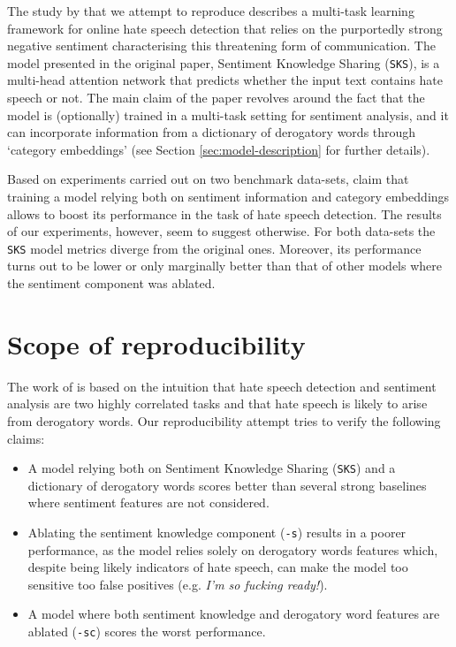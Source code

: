 The study by \cite{original_zhou} that we attempt to reproduce describes a multi-task learning framework for online hate speech detection that relies on the purportedly strong negative sentiment characterising this threatening form of communication. The model presented in the original paper, Sentiment Knowledge Sharing (\texttt{SKS}), is a multi-head attention network that predicts whether the input text contains hate speech or not. The main claim of the paper revolves around the fact that the model is (optionally) trained in a multi-task setting for sentiment analysis, and it can incorporate information from a dictionary of derogatory words through `category embeddings' (see Section \ref{sec:model-description} for further details).

Based on experiments carried out on two benchmark data-sets, \cite{original_zhou} claim that training a model relying both on sentiment information and category embeddings allows to boost its performance in the task of hate speech detection. The results of our experiments, however, seem to suggest otherwise. For both data-sets the \texttt{SKS} model metrics diverge from the original ones. Moreover, its performance turns out to be lower or only marginally better than that of other models where the sentiment component was ablated.



\section{Scope of reproducibility}
\label{sec:claims}

The work of \cite{original_zhou} is based on the intuition that hate speech detection and sentiment analysis are two highly correlated tasks and that hate speech is likely to arise from derogatory words. Our reproducibility attempt tries to verify the following claims:

\begin{itemize}
    \item A model relying both on Sentiment Knowledge Sharing (\texttt{SKS}) and a dictionary of derogatory words scores better than several strong baselines where sentiment features are not considered.
    \item Ablating the sentiment knowledge component (\texttt{-s}) results in a poorer performance, as the model relies solely on derogatory words features which, despite being likely indicators of hate speech, can make the model too sensitive too false positives (e.g. \textit{I’m so fucking ready!}).
    \item A model where both sentiment knowledge and derogatory word features are ablated (\texttt{-sc}) scores the worst performance.
\end{itemize}

